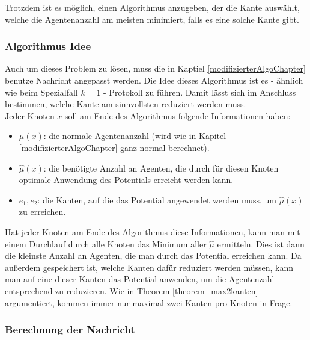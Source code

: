 Trotzdem ist es möglich, einen Algorithmus anzugeben, der die Kante auswählt, welche die Agentenanzahl am meisten minimiert, falls es eine solche Kante gibt.


\subsubsection{Algorithmus Idee}

	Auch um dieses Problem zu lösen, muss die in Kaptiel \ref{modifizierterAlgoChapter} benutze Nachricht angepasst werden. Die Idee dieses Algorithmus ist es - ähnlich wie beim Spezialfall $k = 1$ -  Protokoll zu führen. Damit lässt sich im Anschluss bestimmen, welche Kante am sinnvollsten reduziert werden muss.\\
	Jeder Knoten $x$ soll am Ende des Algorithmus folgende Informationen haben:
	\begin{itemize}
		\item $\mu(x)$: die normale Agentenanzahl (wird wie in Kapitel \ref{modifizierterAlgoChapter} ganz normal berechnet).
		\item $\hat{\mu}(x)$: die benötigte Anzahl an Agenten, die durch für diesen Knoten optimale Anwendung des Potentials erreicht werden kann.
		\item $e_{1}, e_{2}$: die Kanten, auf die das Potential angewendet werden muss, um $\hat{\mu}(x)$ zu erreichen.
	\end{itemize}
	Hat jeder Knoten am Ende des Algorithmus diese Informationen, kann man mit einem Durchlauf durch alle Knoten das Minimum aller $\hat{\mu}$ ermitteln. Dies ist dann die kleinste Anzahl an Agenten, die man durch das Potential erreichen kann. Da außerdem gespeichert ist, welche Kanten dafür reduziert werden müssen, kann man auf eine dieser Kanten das Potential anwenden, um die Agentenzahl entsprechend zu reduzieren. Wie in Theorem \ref{theorem_max2kanten} argumentiert, kommen immer nur maximal zwei Kanten pro Knoten in Frage.
	
	\subsubsection{Berechnung der Nachricht}
	
